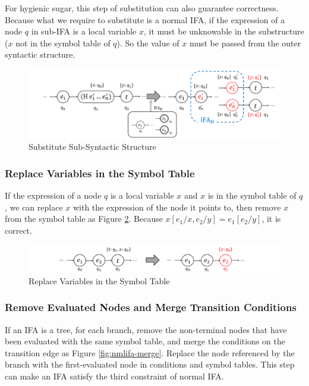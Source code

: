 For hygienic sugar, this step of substitution can also guarantee correctness. Because what we require to substitute is a normal IFA, if the expression of a node $q$ in sub-IFA is a local variable $x$, it must be unknowable in the substructure ($x$ not in the symbol table of $q$). So the value of $x$ must be passed from the outer syntactic structure.

\begin{figure}[t]
    \centering
    \includegraphics[scale=0.25]{images/nmlifa/nmlifa-subst.png}
    \caption{Substitute Sub-Syntactic Structure}
    \label{fig:nmlifa-subst}
\end{figure}

\subsubsection{Replace Variables in the Symbol Table}

If the expression of a node $q$ is a local variable $x$ and $x$ is in the symbol table of $q$, we can replace $x$ with the expression of the node it points to, then remove $x$ from the symbol table as Figure \ref{fig:nmlifa-replace}. Because $x[e_1/x, e_2/y]=e_1[e_2/y]$, it is correct.

\begin{figure}[t]
	\centering
    \includegraphics[scale=0.25]{images/nmlifa/nmlifa-replace.png}
	\caption{Replace Variables in the Symbol Table}
	\label{fig:nmlifa-replace}
\end{figure}

\subsubsection{Remove Evaluated Nodes and Merge Transition Conditions}

If an IFA is a tree, for each branch, remove the non-terminal nodes that have been evaluated with the same symbol table, and merge the conditions on the transition edge as Figure \ref{fig:nmlifa-merge}. Replace the node referenced by the branch with the first-evaluated node in conditions and symbol tables. This step can make an IFA satisfy the third constraint of normal IFA.

